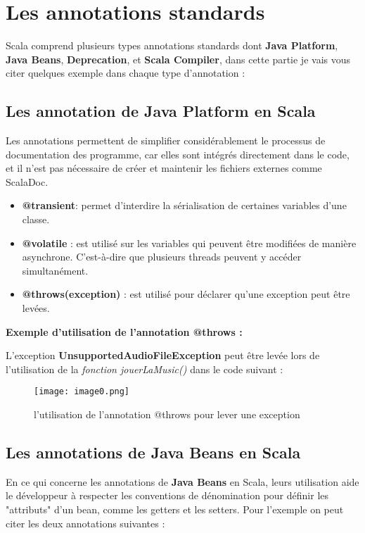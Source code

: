 \documentclass[runningheads]{llncs}
\begin{document}
\section{Les annotations standards}
Scala comprend plusieurs types annotations standards dont \textbf{Java Platform}, \textbf{Java Beans}, \textbf{Deprecation}, et \textbf{Scala Compiler}, dans cette partie je vais vous citer quelques exemple dans chaque type d’annotation :

\subsection{Les annotation de Java Platform en Scala}
Les annotations permettent de simplifier considérablement le processus de documentation des programme, car elles sont intégrés directement dans le code, et il n'est pas nécessaire de créer et maintenir les fichiers externes comme ScalaDoc. 

\begin{itemize}
\item \textbf{@transient}: permet d'interdire la sérialisation de certaines variables d'une classe.
\item \textbf{@volatile} : est utilisé sur les variables qui peuvent être modifiées de manière asynchrone. C'est-à-dire que plusieurs threads peuvent y accéder simultanément.
\item \textbf{@throws(exception)} : est utilisé pour déclarer qu’une exception peut être levées. 
\end{itemize}

\textbf{Exemple d’utilisation de l’annotation @throws :\\}

 L’exception \textbf{UnsupportedAudioFileException} peut être levée lors de l’utilisation de la \textit{fonction jouerLaMusic()} dans le code suivant :

\begin{figure}
\texttt{[image: image0.png]}
\caption{l'utilisation de l'annotation @throws pour lever une exception} \label{fig1}
\end{figure}


\subsection{Les annotations de Java Beans en Scala}
En ce qui concerne les annotations de \textbf{Java Beans} en Scala, leurs utilisation aide le développeur à respecter les conventions de dénomination pour définir les "attributs" d’un bean, comme les getters et les setters. Pour 	l’exemple on peut citer les deux annotations suivantes :
\end{document}
